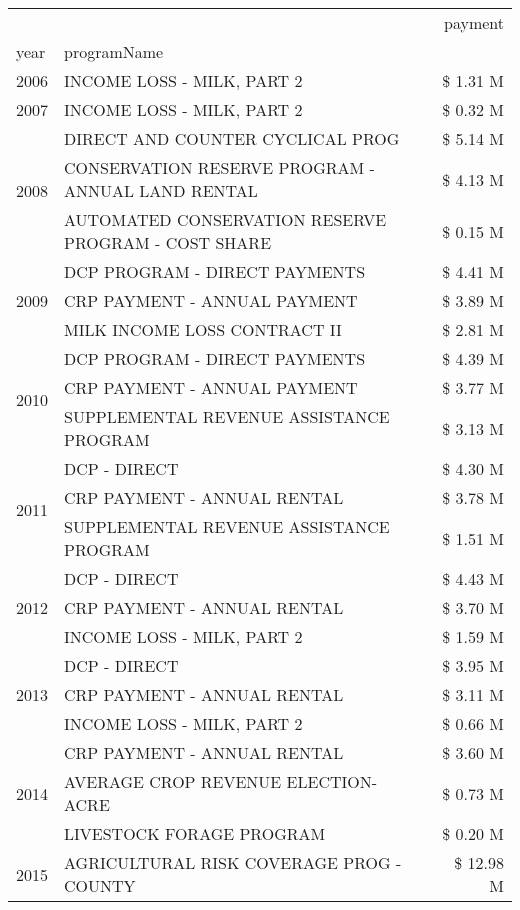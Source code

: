 \begin{tabular}{llr}
\toprule
 &  & payment \\
year & programName &  \\
\midrule
2006 & INCOME LOSS - MILK, PART 2 & \$ 1.31 M \\
\cline{1-3}
2007 & INCOME LOSS - MILK, PART 2 & \$ 0.32 M \\
\cline{1-3}
\multirow[t]{3}{*}{2008} & DIRECT AND COUNTER CYCLICAL PROG & \$ 5.14 M \\
 & CONSERVATION RESERVE PROGRAM - ANNUAL LAND RENTAL & \$ 4.13 M \\
 & AUTOMATED CONSERVATION RESERVE PROGRAM - COST SHARE & \$ 0.15 M \\
\cline{1-3}
\multirow[t]{3}{*}{2009} & DCP PROGRAM - DIRECT PAYMENTS & \$ 4.41 M \\
 & CRP PAYMENT - ANNUAL PAYMENT & \$ 3.89 M \\
 & MILK INCOME LOSS CONTRACT II & \$ 2.81 M \\
\cline{1-3}
\multirow[t]{3}{*}{2010} & DCP PROGRAM - DIRECT PAYMENTS & \$ 4.39 M \\
 & CRP PAYMENT - ANNUAL PAYMENT & \$ 3.77 M \\
 & SUPPLEMENTAL REVENUE ASSISTANCE PROGRAM & \$ 3.13 M \\
\cline{1-3}
\multirow[t]{3}{*}{2011} & DCP - DIRECT & \$ 4.30 M \\
 & CRP PAYMENT - ANNUAL RENTAL & \$ 3.78 M \\
 & SUPPLEMENTAL REVENUE ASSISTANCE PROGRAM & \$ 1.51 M \\
\cline{1-3}
\multirow[t]{3}{*}{2012} & DCP - DIRECT & \$ 4.43 M \\
 & CRP PAYMENT - ANNUAL RENTAL & \$ 3.70 M \\
 & INCOME LOSS - MILK, PART 2 & \$ 1.59 M \\
\cline{1-3}
\multirow[t]{3}{*}{2013} & DCP - DIRECT & \$ 3.95 M \\
 & CRP PAYMENT - ANNUAL RENTAL & \$ 3.11 M \\
 & INCOME LOSS - MILK, PART 2 & \$ 0.66 M \\
\cline{1-3}
\multirow[t]{3}{*}{2014} & CRP PAYMENT - ANNUAL RENTAL & \$ 3.60 M \\
 & AVERAGE CROP REVENUE ELECTION-ACRE & \$ 0.73 M \\
 & LIVESTOCK FORAGE PROGRAM & \$ 0.20 M \\
\cline{1-3}
\multirow[t]{3}{*}{2015} & AGRICULTURAL RISK COVERAGE PROG - COUNTY & \$ 12.98 M \\

\end{tabular}
